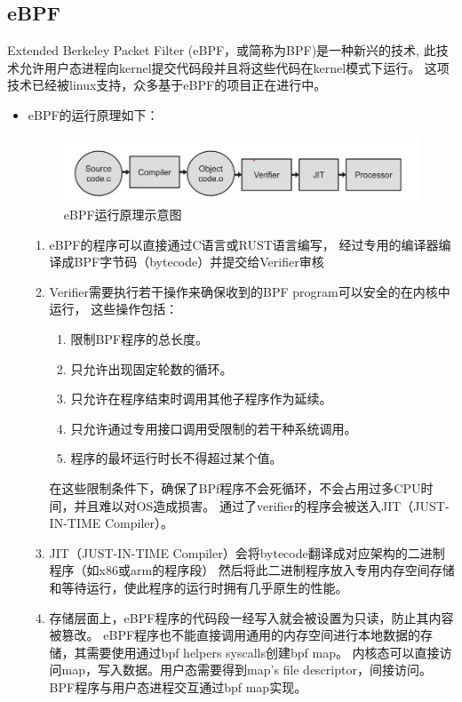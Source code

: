 \documentclass[AutoFakeBold,a4paper]{ctexart}
\begin{document}
\subsection{eBPF}
    Extended Berkeley Packet Filter (eBPF，或简称为BPF)是一种新兴的技术,
    此技术允许用户态进程向kernel提交代码段并且将这些代码在kernel模式下运行。
    这项技术已经被linux支持，众多基于eBPF的项目正在进行中。

\begin{itemize}
    \item eBPF的运行原理如下\cite{vieira2020fast}：
    \begin{figure}[H]
        \centering
        \includegraphics[width=0.9\columnwidth]{../LvHongtao/pic_1.jpg}
        \caption{eBPF运行原理示意图}
    \end{figure}
    \begin{enumerate}
        \item eBPF的程序可以直接通过C语言或RUST语言编写，
        经过专用的编译器编译成BPF字节码（bytecode）并提交给Verifier审核
        \item Verifier需要执行若干操作来确保收到的BPF program可以安全的在内核中运行，
        这些操作包括：
        \begin{enumerate}
            \item 限制BPF程序的总长度。
            \item 只允许出现固定轮数的循环。
            \item 只允许在程序结束时调用其他子程序作为延续。
            \item 只允许通过专用接口调用受限制的若干种系统调用。
            \item 程序的最坏运行时长不得超过某个值。
        \end{enumerate}
        在这些限制条件下，确保了BPf程序不会死循环，不会占用过多CPU时间，并且难以对OS造成损害。
        通过了verifier的程序会被送入JIT（JUST-IN-TIME Compiler）。
        \item JIT（JUST-IN-TIME Compiler）会将bytecode翻译成对应架构的二进制程序（如x86或arm的程序段）
        然后将此二进制程序放入专用内存空间存储和等待运行，使此程序的运行时拥有几乎原生的性能。
        \item 存储层面上，eBPF程序的代码段一经写入就会被设置为只读，防止其内容被篡改。
        eBPF程序也不能直接调用通用的内存空间进行本地数据的存储，其需要使用通过bpf helpers syscalls创建bpf map。
        内核态可以直接访问map，写入数据。用户态需要得到map's file descriptor，间接访问。
        BPF程序与用户态进程交互通过bpf map实现。
        

\end{enumerate}
\end{itemize}
\end{document}
